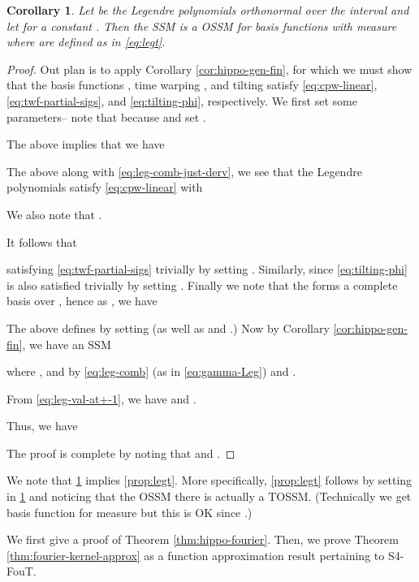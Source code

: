 \documentclass{article}
\newtheorem{corollary}[lemma]{Corollary}
\begin{document}
\begin{corollary}
 Let  be the Legendre polynomials orthonormal over the interval  and let  for a constant . Then the SSM  is a OSSM for basis functions  with measure  where
    are defined as in \eqref{eq:legt}.
\label{cor:hippo-gen-legt}
\end{corollary}
\begin{proof}
Out plan is to apply Corollary \ref{cor:hippo-gen-fin}, for which we must show that the basis functions , time warping , and tilting  satisfy \eqref{eq:cpw-linear}, \eqref{eq:twf-partial-sigs}, and \eqref{eq:tilting-phi}, respectively. We first set some parameters--  note that because  and  set .


The above implies that we have





The above along with \eqref{eq:leg-comb-just-derv}, we see that the Legendre polynomials satisfy \eqref{eq:cpw-linear} with



We also note that .

It follows that


satisfying \eqref{eq:twf-partial-sigs} trivially by setting . Similarly, since  \eqref{eq:tilting-phi} is also satisfied trivially by setting . Finally we note that the  forms a complete basis over , hence as , we have

 


The above defines  by setting  (as well as  and .) Now by Corollary \ref{cor:hippo-gen-fin}, we have an SSM



where , and by \eqref{eq:leg-comb}  (as in \eqref{eq:gamma-Leg}) and .


From \eqref{eq:leg-val-at+-1}, we have   and .

Thus, we have



The proof is complete by noting that  and .

\end{proof}

We note that \cref{cor:hippo-gen-legt} implies \cref{prop:legt}. More specifically, \cref{prop:legt} follows by setting  in \cref{cor:hippo-gen-legt} and noticing that the OSSM there is actually a TOSSM. (Technically we get basis function  for measure  but this is OK since .)


We first give a proof of Theorem \ref{thm:hippo-fourier}. Then, we prove  Theorem \ref{thm:fourier-kernel-approx} as a function approximation result pertaining to S4-FouT.
\end{document}
